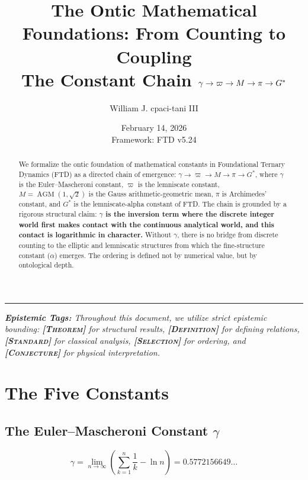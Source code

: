 \documentclass[11pt, letterpaper]{article}
\title{\vspace{-3em}\textbf{The Ontic Mathematical Foundations: From Counting to Coupling\\ \large The Constant Chain $\gamma \to \varpi \to M \to \pi \to \G$}}
\author[1]{William J. cpaci-tani III}
\affil[1]{\textit{Foundational Ternary Dynamics Research}}
\date{February 14, 2026 \\ \vspace{0.5em} \small Framework: FTD v5.24}
\newcommand{\G}{G^*}
\DeclareMathOperator{\AGM}{AGM}
\theoremstyle{definition}
\theoremstyle{remark}
\newcommand{\epi}[1]{\textbf{\textsc{[#1]}}}
\begin{document}
\maketitle

\begin{abstract}
We formalize the ontic foundation of mathematical constants in Foundational Ternary Dynamics (FTD) as a directed chain of emergence: $\gamma \to \varpi \to M \to \pi \to \G$, where $\gamma$ is the Euler--Mascheroni constant, $\varpi$ is the lemniscate constant, $M = \AGM(1, \sqrt{2})$ is the Gauss arithmetic-geometric mean, $\pi$ is Archimedes' constant, and $\G$ is the lemniscate-alpha constant of FTD. The chain is grounded by a rigorous structural claim: \textbf{$\gamma$ is the inversion term where the discrete integer world first makes contact with the continuous analytical world, and this contact is logarithmic in character.} Without $\gamma$, there is no bridge from discrete counting to the elliptic and lemniscatic structures from which the fine-structure constant ($\alpha$) emerges. The ordering is defined not by numerical value, but by ontological depth.
\end{abstract}

\vspace{1em}
\hrule
\vspace{1.5em}

\noindent \textit{\textbf{Epistemic Tags:} Throughout this document, we utilize strict epistemic bounding: \epi{Theorem} for structural results, \epi{Definition} for defining relations, \epi{Standard} for classical analysis, \epi{Selection} for ordering, and \epi{Conjecture} for physical interpretation.}

\vspace{1em}

\section{The Five Constants}

\subsection{The Euler--Mascheroni Constant $\gamma$}

\begin{equation}
    \gamma = \lim_{n \to \infty} \left( \sum_{k=1}^{n} \frac{1}{k} - \ln n \right) = 0.5772156649\dots
\end{equation}
\end{document}
